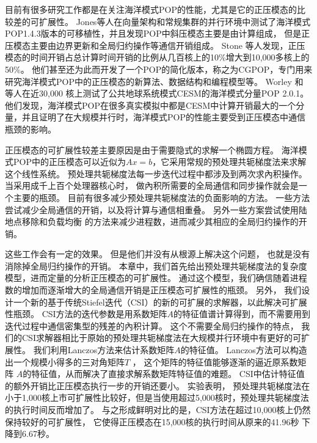 目前有很多研究工作都是在关注海洋模式POP的性能，尤其是它的正压模态的比较差的可扩展性。 
Jones\cite{pop05}等人在向量架构和常规集群的并行环境中测试了海洋模式POP1.4.3版本的可移植性，并且发现POP中斜压模态主要是由计算组成， 但是正压模态主要由边界更新和全局归约操作等通信开销组成。
Stone  \cite{stone2011cgpop}等人发现，正压模态的时间开销占总计算时间开销的比例从几百核上的10\%增大到10,000多核上的50\%。 
他们甚至还为此而开发了一个POP的简化版本，称之为CGPOP，专门用来研究海洋模式POP中的正压模态的新算法、数据结构和编程模型等。 
Worley  \cite{Worley:2011:PCE:2063384.2063457} 和 \cite{dennis2012computational} 等人在近30,000 核上测试了公共地球系统模式CESM的海洋模式分量POP 2.0.1。 
他们发现，海洋模式POP在很多真实模拟中都是CESM中计算开销最大的一个分量，并且证明了在大规模并行时，海洋模式POP的性能主要受到正压模态中通信瓶颈的影响。 
 

 
正压模态的可扩展性较差主要原因是由于需要隐式的求解一个椭圆方程。 
海洋模式POP中的正压模态可以近似为$Ax=b$，它采用常规的预处理共轭梯度法来求解这个线性系统。 
预处理共轭梯度法每一步迭代过程中都涉及到两次求內积操作。 
当采用成千上百个处理器核心时， 做內积所需要的全局通信和同步操作就会是一个主要的瓶颈。 
目前有很多减少预处理共轭梯度法的负面影响的方法。 
一些方法尝试减少全局通信的开销\cite{dAzevedo1999lapack}，以及将计算与通信相重叠\cite{beare1997optimisation}。 
另外一些方案尝试使用陆地点移除和负载均衡\cite{dennis2007inverse, dennis2008scaling} 的方法来减少进程数，进而减少其相应的全局归约操作的开销。 


这些工作会有一定的效果。 
但是他们并没有从根源上解决这个问题， 也就是没有消除掉全局归约操作的开销。 
本章中，我们首先给出预处理共轭梯度法的复杂度模型，进而定量的分析正压模态的可扩展性。 
通过这个模型，我们确信随着进程数的增加而逐渐增大的全局通信开销是正压模态可扩展性的瓶颈。 
另外，  我们设计一个新的基于传统Stiefel迭代（CSI）的新的可扩展的求解器，以此解决可扩展性瓶颈。 
CSI方法的迭代参数是用系数矩阵$A$的特征值谱计算得到，而不需要用到迭代过程中通信密集型的残差的內积计算。
这个不需要全局归约操作的特点， 我们的CSI求解器相比于原始的预处理共轭梯度法在大规模并行环境中有更好的可扩展性。  
我们利用Lanczos方法来估计系数矩阵$A$的特征值。 
Lanczos方法可以构造出一个规模小得多的三对角矩阵$T$ ， 这个矩阵的特征值能够逐渐的逼近原系数矩阵 $A$的特征值，从而解决了直接求解系数矩阵特征值的难题。 
CSI中估计特征值的额外开销比正压模态执行一步的开销还要小。 
实验表明， 预处理共轭梯度法在小于1,000核上市可扩展性比较好，但是当使用超过5,000核时，预处理共轭梯度法的执行时间反而增加了。 
与之形成鲜明对比的是，CSI方法在超过10,000核上仍然保持较好的可扩展性， 它使得正压模态在15,000核的执行时间从原来的41.96秒 下降到6.67秒。 


